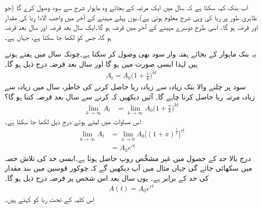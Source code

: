 اب بنک کہہ سکتا ہے کہ سال میں ایک  مرتبہ کے بجائے وہ ماہوار  شرح سے سود وصول کرے  گا (جو ظاہری طور پر ربا کی وہی شرح معلوم ہوتی ہے)۔یوں پہلے مہینے کے آخر میں واجب الادا ربا کی مقدار  اور 
قرضہ  ہو گا۔ اسی طرح دوسرے مہینے کے آخر میں قرضہ  ہو گا۔ایک سال بعد قرضہ  اور  سال بعد قرضہ  ہو گا، جس کو  لکھا جا سکتا ہے، جہاں  ہے۔

یہ بنک ماہوار کے بجائے ہفتہ وار سود بھی وصول کر سکتا ہے۔چونکہ سال میں  ہفتے ہوتے ہیں لہٰذا ایسی صورت میں  ہو گا اور  سال بعد قرضہ درج ذیل ہو گا۔
\begin{align*}
A_t=A_0\big(1+\frac{r}{k}\big)^{kt}
\end{align*}
سود پر چلنے والا بنک زیادہ سے زیادہ ربا حاصل کرنے کی خاطر، سال میں  زیادہ سے زیادہ مرتبہ ربا حاصل کرنا چاہے گا۔ آئیں دیکھیں کہ  کرنے سے  سال بعد قرضہ کتنا ہو گا؟
\begin{align*}
\lim_{k\to \infty}A_t&=\lim_{k\to \infty} A_0\big(1+\frac{r}{k}\big)^{kt}
\end{align*}
اس مساوات میں   لیتے ہوئے درج ذیل لکھا جا سکتا ہے۔
\begin{align*}
\lim_{k\to \infty}A_t&=\lim_{x\to 0} A_0\big [(1+x)^{\tfrac{1}{x}}\big]^{rt}\\
&=A_0e^{rt}
\end{align*}
درج بالا حد کے حصول میں غیر مشخَّص روپ  حاصل ہوتا ہے۔ایسی حد کی تلاش حصہ  میں سکھائی جائے گی جہاں مثال  میں آپ دیکھیں گے کہ چوکور قوسین میں بند مقدار کی حد   کے برابر ہے۔   یوں  سال بعد اس شخص پر قرضہ درج ذیل ہو گا۔
\begin{align}\label{مساوات_ماورائی_سود_در_سود}
A(t)=A_0e^{rt}
\end{align}
اس کلیہ کے تحت  ربا کو  کہتے ہیں۔

